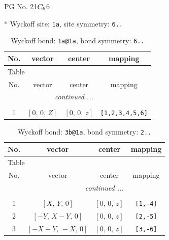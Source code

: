 \documentclass[fleqn,8pt]{jsarticle}
\begin{document}
\setcounter{MaxMatrixCols}{32}

\renewcommand{\tablename}{Table~}
\renewcommand{\figurename}{Figure~}
\begin{center}
\LARGE
PG No. 21\quad$C_{\rm 6}$\quad$6$\quad[ hexagonal ]
\end{center}


* Wyckoff site: {\tt 1a}, site symmetry: {\tt 6..}
\renewcommand{\arraystretch}{1.2}
\begin{longtable}{cccc}
\caption{Wyckoff bond: {\tt 1a@1a}, bond symmetry: {\tt 6..}}
 \\
 \hline \hline
No. & vector & center & mapping \\ \hline \endfirsthead

\multicolumn{3}{l}{\tablename\ \thetable{}} \\
 \hline \hline
No. & vector & center & mapping \\ \hline \endhead

 \hline \hline
\multicolumn{3}{r}{\footnotesize\it continued ...} \\ \endfoot

 \hline \hline
\multicolumn{3}{r}{} \\ \endlastfoot

1 & $\left[ 0,\, 0,\, Z \right]$ & $\left[ 0,\, 0,\, z \right]$ & {\tt [1,2,3,4,5,6]} \\
\end{longtable}
\renewcommand{\arraystretch}{1.2}
\begin{longtable}{cccc}
\caption{Wyckoff bond: {\tt 3b@1a}, bond symmetry: {\tt 2..}}
 \\
 \hline \hline
No. & vector & center & mapping \\ \hline \endfirsthead

\multicolumn{3}{l}{\tablename\ \thetable{}} \\
 \hline \hline
No. & vector & center & mapping \\ \hline \endhead

 \hline \hline
\multicolumn{3}{r}{\footnotesize\it continued ...} \\ \endfoot

 \hline \hline
\multicolumn{3}{r}{} \\ \endlastfoot

1 & $\left[ X,\, Y,\, 0 \right]$ & $\left[ 0,\, 0,\, z \right]$ & {\tt [1,-4]} \\ \hline
2 & $\left[ - Y,\, X - Y,\, 0 \right]$ & $\left[ 0,\, 0,\, z \right]$ & {\tt [2,-5]} \\ \hline
3 & $\left[ - X + Y,\, - X,\, 0 \right]$ & $\left[ 0,\, 0,\, z \right]$ & {\tt [3,-6]} \\
\end{longtable}
\end{document}
